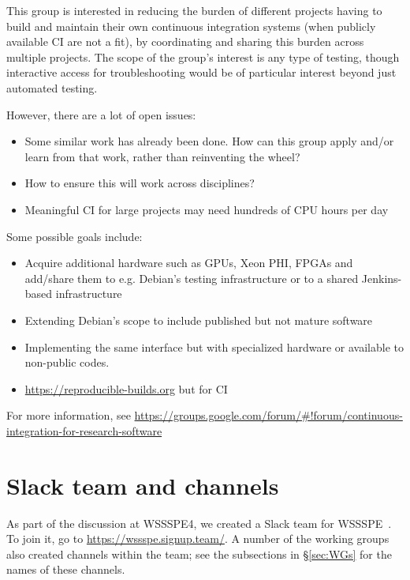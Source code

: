 \documentclass[11pt, oneside]{amsart}
\begin{document}
This group is interested in reducing the burden of different projects having to build and maintain their own continuous integration systems (when publicly available CI are not a fit), by coordinating and sharing this burden across multiple projects.
%
The scope of the group's interest is any type of testing, though interactive access for troubleshooting would be of particular interest beyond just automated testing.

However, there are a lot of open issues:
\begin{itemize}
\item Some similar work has already been done.  How can this group apply and/or learn from that work, rather than reinventing the wheel?
\item How to ensure this will work across disciplines?
\item Meaningful CI for large projects may need hundreds of CPU hours per day
\end{itemize}

Some possible goals include:
\begin{itemize}
\item Acquire additional hardware such as GPUs, Xeon PHI, FPGAs and add/share them to e.g. Debian's testing infrastructure or to a shared Jenkins-based infrastructure
\item Extending Debian's scope to include published but not mature software
\item Implementing the same interface but with specialized hardware or available to non-public codes.
\item \url{https://reproducible-builds.org} but for CI
\end{itemize}

For more information, see \url{https://groups.google.com/forum/#!forum/continuous-integration-for-research-software}








\section{Slack team and channels}\label{sec:slack}


As part of the discussion at WSSSPE4, we created a Slack team for WSSSPE~\cite{WSSSPESlack}.  To join it, go to \url{https://wssspe.signup.team/}.  A number of the working groups also created channels within the team; see the subsections in \S\ref{sec:WGs} for the names of these channels.
\end{document}
